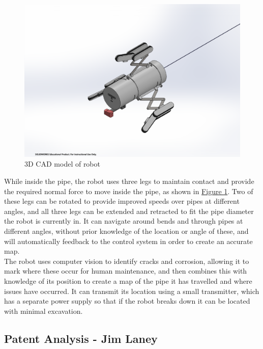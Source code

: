 \documentclass[11pt]{article}		%
\newlength{\imageheight}	 %
\begin{document}
	\begin{figure}[h] %
		\centering
		\includegraphics[trim={6cm 2cm 7cm 4cm},clip,height=\imageheight]{overviewCAD}
		\caption{3D CAD model of robot}
		\label{3DSketch}
	\end{figure}
	
	While inside the pipe, the robot uses three legs to maintain contact and provide the required normal force to move inside the pipe, as shown in \hyperref[3DSketch]{Figure \ref*{3DSketch}}.
	Two of these legs can be rotated to provide improved speeds over pipes at different angles, and all three legs can be extended and retracted to fit the pipe diameter the robot is currently in.
	It can navigate around bends and through pipes at different angles, without prior knowledge of the location or angle of these, and will automatically feedback to the control system in order to create an accurate map.
	\\
	The robot uses computer vision to identify cracks and corrosion, allowing it to mark where these occur for human maintenance, and then combines this with knowledge of its position to create a map of the pipe it has travelled and where issues have occurred.
	It can transmit its location using a small transmitter, which has a separate power supply so that if the robot breaks down it can be located with minimal excavation.
	
	\subsection[Patent Analysis]{Patent Analysis - Jim Laney}
	
\end{document}
